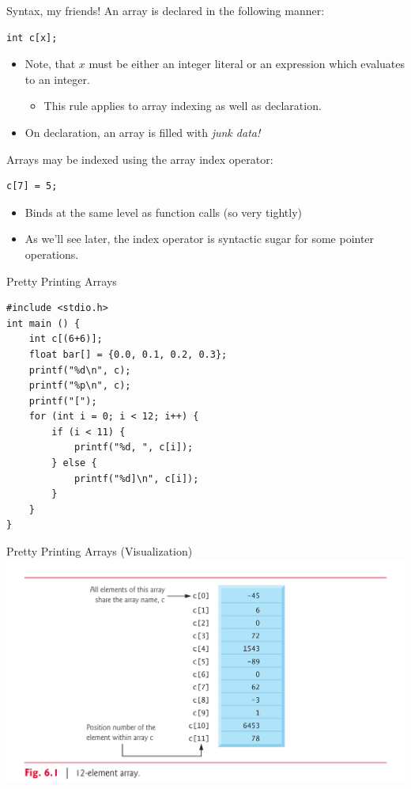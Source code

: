 \documentclass[11pt]{beamer}
\begin{document}
\begin{frame}[fragile=singleslide]{Syntax, my friends!}
An array is declared in the following manner:
\begin{lstlisting}[style=C]
int c[x];
\end{lstlisting}
\begin{itemize}
\item Note, that $x$ must be either an integer literal or an expression which evaluates to an integer. 
\begin{itemize}
\item This rule applies to array indexing as well as declaration.
\end{itemize} 
\item On declaration, an array is filled with \emph{junk data!}
\end{itemize}
Arrays may be indexed using the array index operator:
\begin{lstlisting}[style=C] 
c[7] = 5;
\end{lstlisting} 
\begin{itemize}
\item Binds at the same level as function calls (so very tightly)
\item As we'll see later, the index operator is syntactic sugar for some pointer operations.
\end{itemize}
\end{frame}

\begin{frame}[fragile=singleslide]{Pretty Printing Arrays}
\begin{lstlisting}[style=C] 
#include <stdio.h>
int main () {
	int c[(6+6)];
	float bar[] = {0.0, 0.1, 0.2, 0.3};
	printf("%d\n", c);
	printf("%p\n", c);
	printf("[");
	for (int i = 0; i < 12; i++) {
		if (i < 11) {
			printf("%d, ", c[i]);
		} else {
			printf("%d]\n", c[i]);
		}
	}
}
\end{lstlisting} 
\end{frame}

\begin{frame}{Pretty Printing Arrays (Visualization)}
\center
\includegraphics[scale=0.1]{array.png}
\end{frame}
\end{document}

